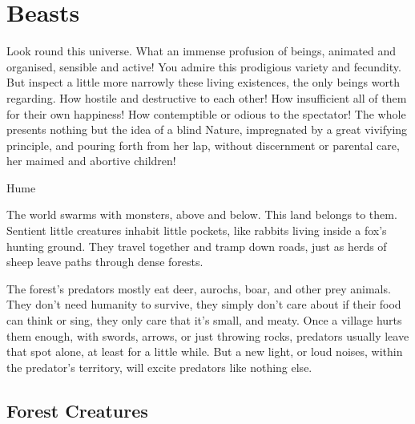 \chapter{Beasts}
\label{bestiary}

\epigraph{Look round this universe. What an immense profusion of beings, animated and organised, sensible and active! You admire this prodigious variety and fecundity. But inspect a little more narrowly these living existences, the only beings worth regarding. How hostile and destructive to each other! How insufficient all of them for their own happiness! How contemptible or odious to the spectator! The whole presents nothing but the idea of a blind Nature, impregnated by a great vivifying principle, and pouring forth from her lap, without discernment or parental care, her maimed and abortive children!}{Hume}


The world swarms with monsters, above and below.
This land belongs to them.
Sentient little creatures inhabit little pockets, like rabbits living inside a fox's hunting ground.
They travel together and tramp down roads, just as herds of sheep leave paths through dense forests.

The forest's predators mostly eat deer, aurochs, boar, and other prey animals.
They don't need humanity to survive, they simply don't care about if their food can think or sing, they only care that it's small, and meaty.
Once a village hurts them enough, with swords, arrows, or just throwing rocks, predators usually leave that spot alone, at least for a little while.
But a new light, or loud noises, within the predator's territory, will excite predators like nothing else.

\section[Forest Creatures]{Forest Creatures \A}


